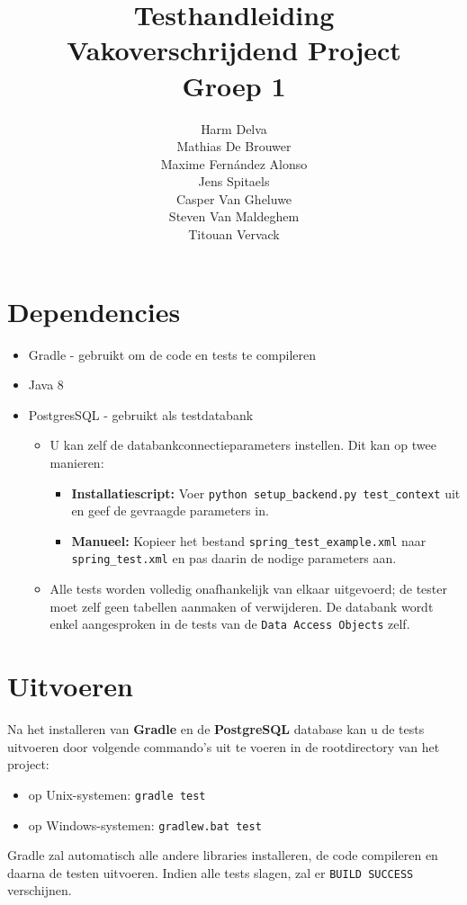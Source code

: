 \documentclass[a4paper,11pt]{article}
\begin{document}

\title{Testhandleiding\\Vakoverschrijdend Project\\Groep 1}
\author{Harm Delva\\ Mathias De Brouwer\\ Maxime Fern\'andez Alonso\\ Jens Spitaels\\ Casper Van Gheluwe\\ Steven Van Maldeghem\\ Titouan Vervack}
\date{}
\maketitle


\section*{Dependencies}
\begin{itemize}
	\item Gradle - gebruikt om de code en tests te compileren
	\item Java 8
	\item PostgresSQL - gebruikt als testdatabank
	\begin{itemize}
		\item U kan zelf de databankconnectieparameters instellen. Dit kan op twee manieren:
		\begin{itemize}
			\item \textbf{Installatiescript:} Voer \texttt{python setup\_backend.py test\_context} uit en geef de gevraagde parameters in.
			\item \textbf{Manueel:} Kopieer het bestand \texttt{spring\_test\_example.xml} naar \texttt{spring\_test.xml} en pas daarin de nodige parameters aan.
		\end{itemize}
		\item Alle tests worden volledig onafhankelijk van elkaar uitgevoerd; de tester moet zelf geen tabellen aanmaken of verwijderen. De databank wordt enkel aangesproken in de tests van de \texttt{Data Access Objects} zelf.
	\end{itemize}
\end{itemize}

\section*{Uitvoeren}
Na het installeren van \textbf{Gradle} en de \textbf{PostgreSQL} database kan u de tests uitvoeren door volgende commando's uit te voeren in de rootdirectory van het project:
\begin{itemize}
	\item op Unix-systemen: \texttt{gradle test}
	\item op Windows-systemen: \texttt{gradlew.bat test}
\end{itemize}
\noindent Gradle zal automatisch alle andere libraries installeren, de code compileren en daarna de testen uitvoeren. Indien alle tests slagen, zal er \texttt{BUILD SUCCESS} verschijnen.
\end{document}
